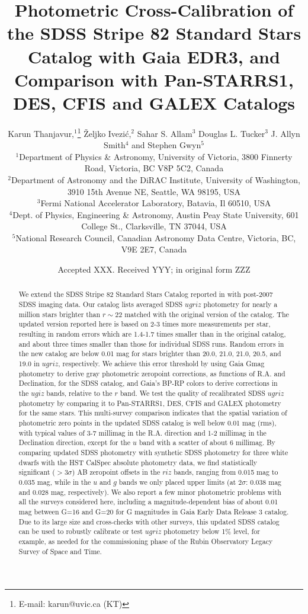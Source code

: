 \documentclass[fleqn,usenatbib]{mnras}
\title[SDSS Stripe 82 Standard Stars Catalog: New and Improved]{Photometric Cross-Calibration
of the SDSS Stripe 82 Standard Stars Catalog with Gaia EDR3, and Comparison with Pan-STARRS1, DES, 
CFIS and GALEX Catalogs}
\author[K. Thanjavur et al.]{
Karun Thanjavur,$^{1}$\thanks{E-mail: karun@uvic.ca (KT)}
\v{Z}eljko Ivezi\'{c},$^{2}$
Sahar S. Allam$^{3}$
Douglas L. Tucker$^{3}$
J. Allyn Smith$^{4}$
and Stephen Gwyn$^{5}$
\\
$^{1}$Department of Physics \& Astronomy, University of Victoria, 3800 Finnerty Road, Victoria, BC V8P 5C2, Canada\\
$^{2}$Department of Astronomy and the DiRAC Institute, University of Washington, 3910 15th Avenue NE, Seattle, WA 98195, USA\\
$^{3}$Fermi National Accelerator Laboratory, Batavia, Il 60510, USA\\
$^{4}$Dept. of Physics, Engineering \& Astronomy, Austin Peay State University, 601 College St., Clarksville, TN 37044, USA\\
$^{5}$National Research Council, Canadian Astronomy Data Centre, Victoria, BC, V9E 2E7, Canada
}
\date{Accepted XXX. Received YYY; in original form ZZZ}
\begin{document}
\label{firstpage}
\pagerange{\pageref{firstpage}--\pageref{lastpage}}
\maketitle

\begin{abstract}
We extend the SDSS Stripe 82 Standard Stars Catalog reported in \citet{Ivez07} with
post-2007 SDSS imaging data. Our catalog lists averaged SDSS $ugriz$ photometry
for nearly a million stars brighter than $r\sim22$ matched with the original version of the catalog. 
The updated version reported here is based on 2-3 times more measurements per star, resulting 
in random errors which are 1.4-1.7 times smaller than in the original catalog, and about three 
times smaller than those for individual SDSS runs. Random errors in the new catalog are below 
0.01 mag for stars brighter than 20.0, 21.0, 21.0, 20.5, and 19.0 in $ugriz$, respectively. 
We achieve this error threshold by using Gaia Gmag photometry to derive gray photometric 
zeropoint corrections, as functions of R.A. and Declination, for the SDSS catalog, and Gaia's 
BP-RP colors to derive corrections in the $ugiz$ bands, relative to the $r$ band. We test the 
quality of recalibrated SDSS $ugriz$ photometry by comparing it to Pan-STARRS1, DES, CFIS 
and GALEX photometry for the same stars. This multi-survey 
comparison indicates that the spatial variation of photometric zero points in the updated SDSS 
catalog is well below 0.01 mag (rms), with typical values of 3-7 millimag in the R.A. direction and 
1-2 millimag in the Declination direction, except for the $u$ band with a scatter of about 6 millimag.
By comparing updated SDSS photometry with synthetic SDSS photometry for three white dwarfs
with the HST CalSpec absolute photometry data, we find statistically significant ($>3\sigma$) 
AB zeropoint offsets in the $riz$ bands, ranging from 0.015 mag to 0.035 mag, while in the $u$ 
and $g$ bands we only placed upper limits (at $2\sigma$: 0.038 mag and 0.028 mag, respectively).  
We also report a few minor photometric problems with all the surveys considered here, including 
a magnitude-dependent bias of about 0.01 mag between G=16 and G=20 for G magnitudes in Gaia 
Early Data Release 3 catalog. Due to its large size and cross-checks with other surveys, this updated 
SDSS catalog can be used to robustly calibrate or test $ugriz$ photometry below 1\% level, for example, 
as needed for the commissioning phase of the Rubin Observatory Legacy Survey of Space and Time. 
\end{abstract}
\end{document}
